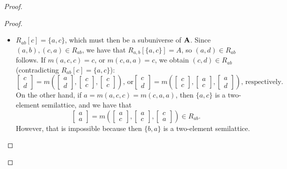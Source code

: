 \documentclass[11pt]{amsart}
\newcommand{\m}[1]{\mathbf{\uppercase{#1}}}
\theoremstyle{definition}
\theoremstyle{remark}
\theoremstyle{plain}
\begin{document}
\begin{proof}
\begin{enumerate}[wide, labelwidth=!,itemindent=!,labelindent=0pt]
\begin{enumerate}[wide, labelwidth=!,labelindent=0pt,itemindent=!]
\begin{enumerate}[wide, labelwidth=!,labelindent=0pt,itemindent=!]
\begin{proof}
\begin{itemize}[leftmargin=*]
\item $R_{ab}[c]=\{a,c\}$, which must then be a subuniverse of $\m a$. Since $(a,b),(c,a)\in R_{ab}$, we have that $R_{a,b}[\{a,c\}]= A$, so $(a,d)\in R_{ab}$ follows. If $m(a,c,c)=c$, or $m(c,a,a)=c$, we obtain $(c,d)\in R_{ab}$ (contradicting $R_{ab}[c]=\{a,c\}$):
$$
\begin{bmatrix}
c \\
d
\end{bmatrix}=
m\left(
\begin{bmatrix}
a \\
d
\end{bmatrix}, 
\begin{bmatrix}
c \\
c
\end{bmatrix},
\begin{bmatrix}
c \\
c
\end{bmatrix}
\right) \text{, or} 
\begin{bmatrix}
c \\
d
\end{bmatrix}=
m\left(
\begin{bmatrix}
c \\
c
\end{bmatrix}, 
\begin{bmatrix}
a \\
c
\end{bmatrix},
\begin{bmatrix}
a \\
d
\end{bmatrix}
\right)\text{, respectively.}
$$
On the other hand, if $a=m(a,c,c)=m(c,a,a)$, then $\{a,c\}$ is a two-element semilattice, and we have that
$$
\begin{bmatrix}
a \\
a
\end{bmatrix}=
m\left(
\begin{bmatrix}
a \\
c
\end{bmatrix}, 
\begin{bmatrix}
a \\
c
\end{bmatrix},
\begin{bmatrix}
c \\
a
\end{bmatrix}
\right)\in R_{ab}.$$
However, that is impossible because then $\{b,a\}$ is a two-element semilattice. 


\end{itemize}
\end{proof}
\end{enumerate}
\end{enumerate}
\end{enumerate}
\end{proof}
\end{document}
